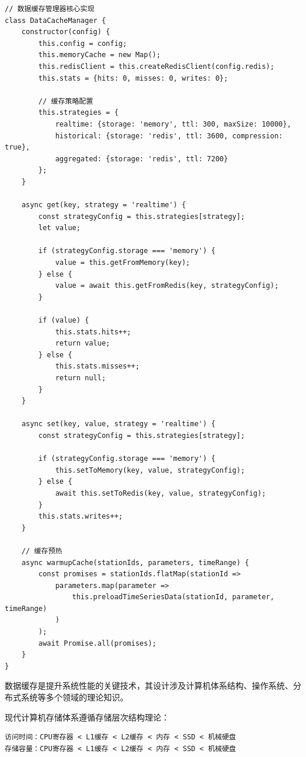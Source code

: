 \begin{lstlisting}[style=javascript]
// 数据缓存管理器核心实现
class DataCacheManager {
    constructor(config) {
        this.config = config;
        this.memoryCache = new Map();
        this.redisClient = this.createRedisClient(config.redis);
        this.stats = {hits: 0, misses: 0, writes: 0};
        
        // 缓存策略配置
        this.strategies = {
            realtime: {storage: 'memory', ttl: 300, maxSize: 10000},
            historical: {storage: 'redis', ttl: 3600, compression: true},
            aggregated: {storage: 'redis', ttl: 7200}
        };
    }
    
    async get(key, strategy = 'realtime') {
        const strategyConfig = this.strategies[strategy];
        let value;
        
        if (strategyConfig.storage === 'memory') {
            value = this.getFromMemory(key);
        } else {
            value = await this.getFromRedis(key, strategyConfig);
        }
        
        if (value) {
            this.stats.hits++;
            return value;
        } else {
            this.stats.misses++;
            return null;
        }
    }
    
    async set(key, value, strategy = 'realtime') {
        const strategyConfig = this.strategies[strategy];
        
        if (strategyConfig.storage === 'memory') {
            this.setToMemory(key, value, strategyConfig);
        } else {
            await this.setToRedis(key, value, strategyConfig);
        }
        this.stats.writes++;
    }
    
    // 缓存预热
    async warmupCache(stationIds, parameters, timeRange) {
        const promises = stationIds.flatMap(stationId => 
            parameters.map(parameter => 
                this.preloadTimeSeriesData(stationId, parameter, timeRange)
            )
        );
        await Promise.all(promises);
    }
}
\end{lstlisting}


数据缓存是提升系统性能的关键技术，其设计涉及计算机体系结构、操作系统、分布式系统等多个领域的理论知识。


现代计算机存储体系遵循存储层次结构理论：

\begin{lstlisting}
访问时间：CPU寄存器 < L1缓存 < L2缓存 < 内存 < SSD < 机械硬盘
存储容量：CPU寄存器 < L1缓存 < L2缓存 < 内存 < SSD < 机械硬盘
\end{lstlisting}

